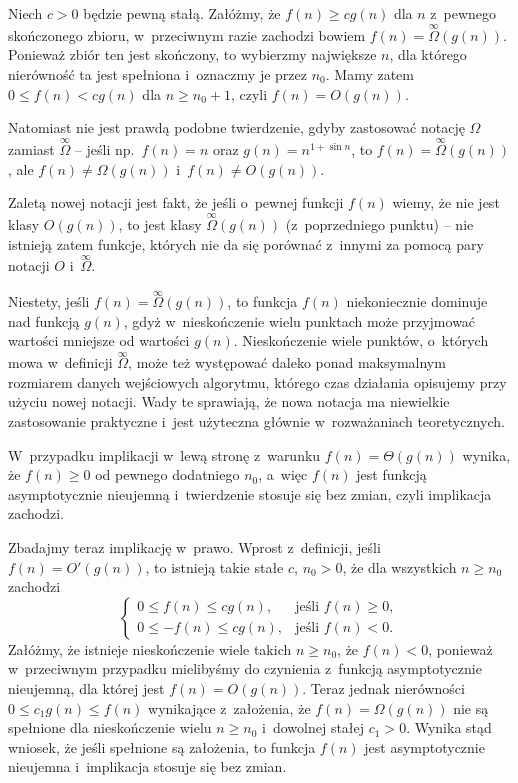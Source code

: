 
\subproblem %
Niech $c>0$ będzie pewną stałą.
Załóżmy, że $f(n)\ge cg(n)$ dla $n$ z~pewnego skończonego zbioru, w~przeciwnym razie zachodzi bowiem $f(n)=\overset{\infty}{\Omega}(g(n))$.
Ponieważ zbiór ten jest skończony, to wybierzmy największe $n$, dla którego nierówność ta jest spełniona i~oznaczmy je przez $n_0$.
Mamy zatem $0\le f(n)<cg(n)$ dla $n\ge n_0+1$, czyli $f(n)=O(g(n))$.

Natomiast nie jest prawdą podobne twierdzenie, gdyby zastosować notację $\Omega$ zamiast $\overset{\infty}{\Omega}$ -- jeśli np.\ $f(n)=n$ oraz $g(n)=n^{1+\sin n}$, to $f(n)=\overset{\infty}{\Omega}(g(n))$, ale $f(n)\ne\Omega(g(n))$ i~$f(n)\ne O(g(n))$.

\subproblem %
Zaletą nowej notacji jest fakt, że jeśli o~pewnej funkcji $f(n)$ wiemy, że nie jest klasy $O(g(n))$, to jest klasy $\overset{\infty}{\Omega}(g(n))$ (z~poprzedniego punktu) -- nie istnieją zatem funkcje, których nie da się porównać z~innymi za pomocą pary notacji $O$ i~$\overset{\infty}{\Omega}$.

Niestety, jeśli $f(n)=\overset{\infty}{\Omega}(g(n))$, to funkcja $f(n)$ niekoniecznie dominuje nad funkcją $g(n)$, gdyż w~nieskończenie wielu punktach może przyjmować wartości mniejsze od wartości $g(n)$.
Nieskończenie wiele punktów, o~których mowa w~definicji $\overset{\infty}{\Omega}$, może też występować daleko ponad maksymalnym rozmiarem danych wejściowych algorytmu, którego czas działania opisujemy przy użyciu nowej notacji.
Wady te sprawiają, że nowa notacja ma niewielkie zastosowanie praktyczne i~jest użyteczna głównie w~rozważaniach teoretycznych.

\subproblem %
W~przypadku implikacji w~lewą stronę z~warunku $f(n)=\Theta(g(n))$ wynika, że $f(n)\ge0$ od pewnego dodatniego $n_0$, a~więc $f(n)$ jest funkcją asymptotycznie nieujemną i~twierdzenie stosuje się bez zmian, czyli implikacja zachodzi.

Zbadajmy teraz implikację w~prawo.
Wprost z~definicji, jeśli $f(n)=O'(g(n))$, to istnieją takie stałe $c$, $n_0>0$, że dla wszystkich $n\ge n_0$ zachodzi
\[
	\begin{cases}
		0 \le f(n) \le cg(n), & \text{jeśli $f(n)\ge0$}, \\
		0 \le -f(n) \le cg(n), & \text{jeśli $f(n)<0$}.
	\end{cases}
\]
Załóżmy, że istnieje nieskończenie wiele takich $n\ge n_0$, że $f(n)<0$, ponieważ w~przeciwnym przypadku mielibyśmy do czynienia z~funkcją asymptotycznie nieujemną, dla której jest $f(n)=O(g(n))$.
Teraz jednak nierówności $0\le c_1g(n)\le f(n)$ wynikające z~założenia, że $f(n)=\Omega(g(n))$ nie są spełnione dla nieskończenie wielu $n\ge n_0$ i~dowolnej stałej $c_1>0$.
Wynika stąd wniosek, że jeśli spełnione są założenia, to funkcja $f(n)$ jest asymptotycznie nieujemna i~implikacja stosuje się bez zmian.

